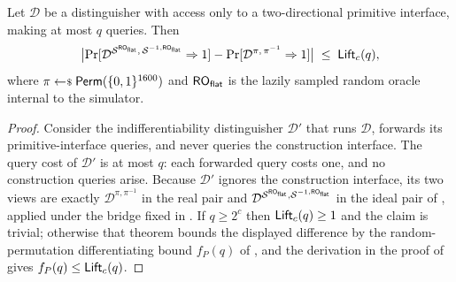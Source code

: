 \begin{lemma}
\label{lem:sim-perm-proximity}
Let $\mathcal{D}$ be a distinguisher with access only to a two-directional
primitive interface, making at most $q$ queries. Then
\[
  \bigl|
    \Pr[\mathcal{D}^{\mathcal{S}^{\mathsf{RO}_{\mathsf{flat}}},\, \mathcal{S}^{-1,\mathsf{RO}_{\mathsf{flat}}}} \Rightarrow 1]
    - \Pr[\mathcal{D}^{\pi,\, \pi^{-1}} \Rightarrow 1]
  \bigr|
  \;\leq\; \mathsf{Lift}_c(q),
\]
where $\pi \sample \Perm(\bits^{1600})$ and $\mathsf{RO}_{\mathsf{flat}}$ is the lazily
sampled random oracle internal to the simulator.
\end{lemma}

\begin{proof}
Consider the indifferentiability distinguisher $\mathcal{D}'$ that runs
$\mathcal{D}$, forwards its primitive-interface queries, and never queries
the construction interface. The \cite{BDPV08} query cost of $\mathcal{D}'$
is at most $q$: each forwarded query costs one, and no construction queries
arise. Because $\mathcal{D}'$ ignores the construction interface, its two
views are exactly $\mathcal{D}^{\pi,\pi^{-1}}$ in the real pair and
$\mathcal{D}^{\mathcal{S}^{\mathsf{RO}_{\mathsf{flat}}},\mathcal{S}^{-1,\mathsf{RO}_{\mathsf{flat}}}}$ in the ideal pair of
\cite[Theorem~2]{BDPV08}, applied under the \cite[Theorem~3]{BDPV11}
bridge fixed in . If $q \geq 2^c$ then
$\mathsf{Lift}_c(q) \geq 1$ and the claim is trivial; otherwise that theorem
bounds the displayed difference by the random-permutation differentiating
bound $f_P(q)$ of \cite[Lemma~5]{BDPV08}, and the derivation in the proof
of  gives $f_P(q) \leq \mathsf{Lift}_c(q)$.
\end{proof}

